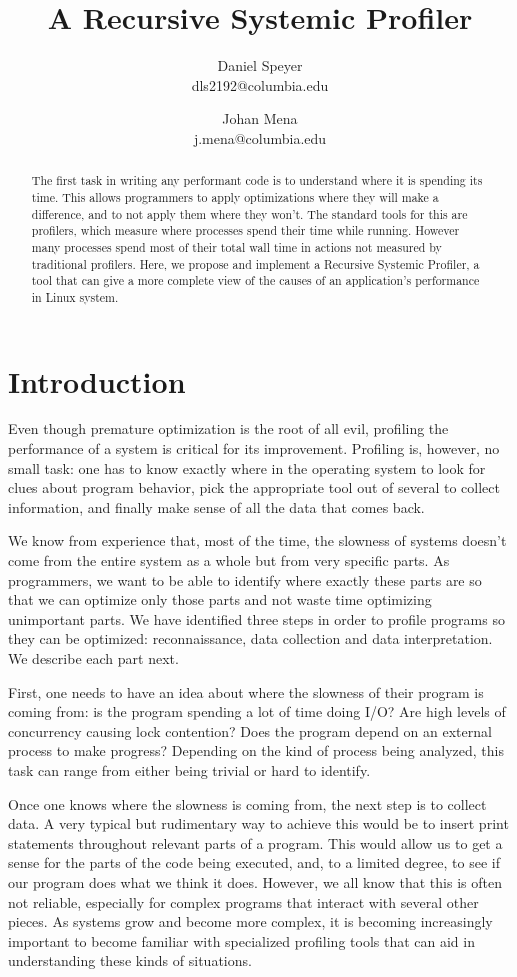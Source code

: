 \documentclass[10pt]{article}
\author{Daniel Speyer\\dls2192@columbia.edu \and Johan Mena\\j.mena@columbia.edu}
\title{\textbf{A Recursive Systemic Profiler}}
\date{}
\begin{document}
\maketitle

\begin{abstract}
The first task in writing any performant code is to understand where it is spending its time. This allows programmers to apply optimizations where they will make a difference, and to not apply them where they won't. The standard tools for this are profilers, which measure where processes spend their time while running. However many processes spend most of their total wall time in actions not measured by traditional profilers. Here, we propose and implement a Recursive Systemic Profiler, a tool that can give a more complete view of the causes of an application’s performance in Linux system.
\end{abstract}

\section{Introduction}
Even though premature optimization is the root of all evil, profiling the performance of a system is critical for its improvement. Profiling is, however, no small task: one has to know exactly where in the operating system to look for clues about program behavior, pick the appropriate tool out of several to collect information, and finally make sense of all the data that comes back.

We know from experience that, most of the time, the slowness of systems doesn't come from the entire system as a whole but from very specific parts. As programmers, we want to be able to identify where exactly these parts are so that we can optimize only those parts and not waste time optimizing unimportant parts. We have identified three steps in order to profile programs so they can be optimized: reconnaissance, data collection and data interpretation. We describe each part next.

First, one needs to have an idea about where the slowness of their program is coming from: is the program spending a lot of time doing I/O? Are high levels of concurrency causing lock contention? Does the program depend on an external process to make progress? Depending on the kind of process being analyzed, this task can range from either being trivial or hard to identify.

Once one knows where the slowness is coming from, the next step is to collect data. A very typical but rudimentary way to achieve this would be to insert print statements throughout relevant parts of a program. This would allow us to get a sense for the parts of the code being executed, and, to a limited degree, to see if our program does what we think it does. However, we all know that this is often not reliable, especially for complex programs that interact with several other pieces. As systems grow and become more complex, it is becoming increasingly important to become familiar with specialized profiling tools that can aid in understanding these kinds of situations.
\end{document}
